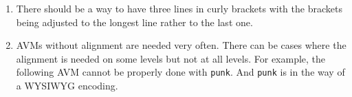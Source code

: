 \documentclass[output=book
		,modfonts
		,nonflat
	        ,collection
	        ,collectionchapter
	        ,collectiontoclongg
 	        ,biblatex  
                ,babelshorthands
                ,newtxmath
                ,colorlinks, citecolor=brown 
                ,draftmode
		  ]{langscibook}
\begin{document}
\begin{enumerate}
\item 

There should be a way to have three lines in curly brackets with the brackets being adjusted to the
longest line rather to the last one.
\ea
{}
\z

\item 
AVMs without alignment are needed very often. There can be cases where the alignment is needed
on some levels but not at all levels. For example, the following AVM cannot be properly done with
\verb+punk+. And \verb+punk+ is in the way of a WYSIWYG encoding.
\eal
\ex 
\ex
{}





\zl




\end{enumerate}
\end{document}
